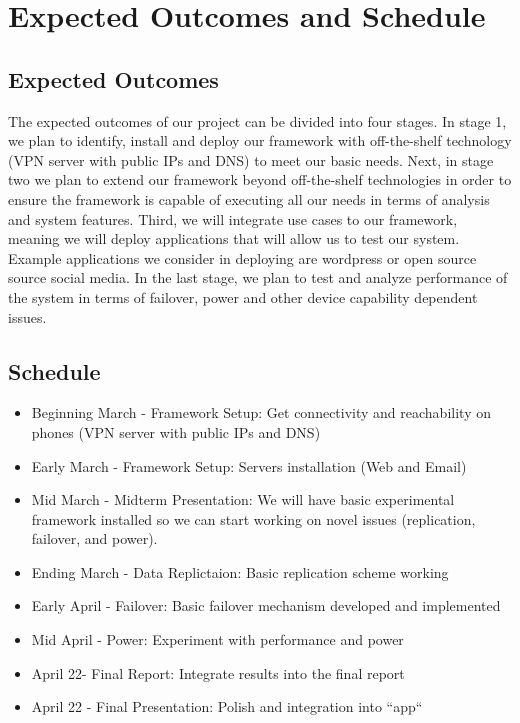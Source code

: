 \section{Expected Outcomes and Schedule}

\subsection{Expected Outcomes}
% 
The expected outcomes of our project can be divided into four stages. In stage 1, we plan to identify, install and deploy our framework with off-the-shelf technology (VPN server with public IPs and DNS) to meet our basic needs. 
Next, in stage two we plan to extend our framework beyond off-the-shelf technologies in order to ensure the framework is capable of executing all our needs in terms of analysis and system features.
Third, we will integrate use cases to our framework, meaning we will deploy applications that will allow us to test our system. Example applications we consider in deploying are wordpress or open source source social media.
In the last stage, we plan to test and analyze performance of the system in terms of failover, power and other device capability dependent issues. 

\subsection{Schedule}
\begin{itemize}
 \item Beginning March - Framework Setup: Get connectivity and reachability on phones (VPN server with public IPs and DNS)
 \item Early March - Framework Setup: Servers installation (Web and Email)
 \item Mid March - Midterm Presentation: We will have basic experimental framework installed so we can start working on novel issues (replication, failover, and power).
 \item Ending March - Data Replictaion: Basic replication scheme working
 \item Early April - Failover: Basic failover mechanism developed and implemented
 \item Mid April - Power: Experiment with performance and power
 \item April 22- Final Report: Integrate results into the final report
 \item April 22 - Final Presentation: Polish and integration into ``app`` 
\end{itemize}

